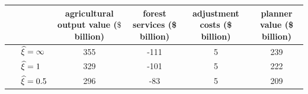 
\begin{tabular}{lcccc}
\toprule
 &\makecell[c]{agricultural \\ output value \\ ($\$$ billion)} & \makecell[c]{forest \\ services \\ (\$ billion)} & \makecell[c]{adjustment \\ costs \\ (\$ billion)} & \makecell[c]{planner \\ value \\ (\$ billion)} \\
\midrule

$\hspace{.5cm} \widehat \xi = \infty$ & 355 & -111 & 5 & 239 \\
$\hspace{.5cm} \widehat \xi = 1$ & 329  & -101 & 5 & 222 \\
$\hspace{.5cm} \widehat \xi = 0.5$ & 296  & -83 & 5 & 209 \\
 
\bottomrule
\end{tabular}

